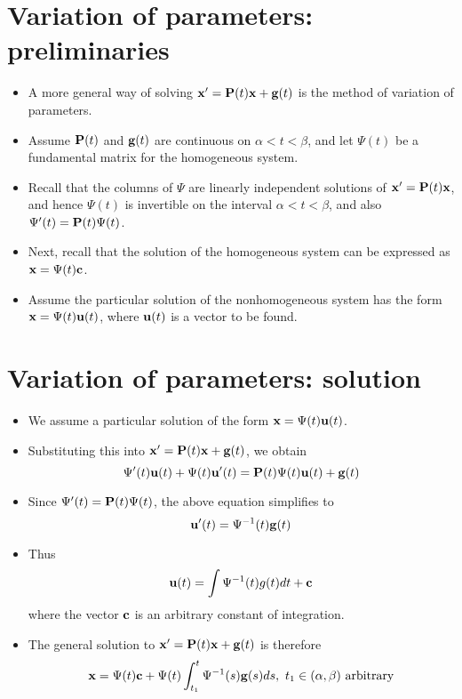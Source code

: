 \documentclass[11pt,a4paper]{article}
\begin{document}
	\section*{Variation of parameters: preliminaries}
	\begin{itemize}
		\item A more general way of solving $\vb{x}^\prime = \vb{P}(t)\vb{x} + \vb{g}(t)$ is the method of variation of parameters.
		\item Assume $\vb{P}(t)$ and $\vb{g}(t)$ are continuous on $\alpha < t < \beta$, and let $\Psi(t)$ be a fundamental matrix for the homogeneous system.
		\item Recall that the columns of $\Psi$ are linearly independent solutions of $\vb{x}^\prime = \vb{P}(t)\vb{x}$, and hence $\Psi(t)$ is invertible on the interval $\alpha < t < \beta$, and also $\Psi^\prime(t) = \vb{P}(t)\Psi(t)$.
		\item Next, recall that the solution of the homogeneous system can be expressed as $\vb{x} = \Psi(t)\vb{c}$.
		\item Assume the particular solution of the nonhomogeneous system has the form $\vb{x} = \Psi(t)\vb{u}(t)$, where $\vb{u}(t)$ is a vector to be found. 
	\end{itemize}
	\section*{Variation of parameters: solution}
	\begin{itemize}
		\item We assume a particular solution of the form $\vb{x} = \Psi(t)\vb{u}(t)$.
		\item Substituting this into $\vb{x}^\prime = \vb{P}(t)\vb{x} + \vb{g}(t)$, we obtain
		$$
		\Psi^\prime(t)\vb{u}(t) + \Psi(t)\vb{u}^\prime(t) = \vb{P}(t)\Psi(t)\vb{u}(t) + \vb{g}(t)
		$$
		\item Since $\Psi^\prime (t) = \vb{P}(t) \Psi(t)$, the above equation simplifies to
		$$
		\vb{u}^\prime (t) = \Psi^{-1}(t)\vb{g}(t)
		$$
		\item Thus
		$$
		\vb{u}(t) = \int \Psi^{-1}(t)g(t)dt + \vb{c}
		$$
		where the vector $\vb{c}$ is an arbitrary constant of integration.
		\item The general solution to $\vb{x}^\prime = \vb{P}(t)\vb{x} + \vb{g}(t)$ is therefore
		$$
		\vb{x} = \Psi(t)\vb{c} + \Psi(t)\int_{t_1}^t \Psi^{-1}(s)\vb{g}(s)ds,\ t_1\in (\alpha, \beta)\ \text{arbitrary}
		$$
	\end{itemize}
\end{document}
